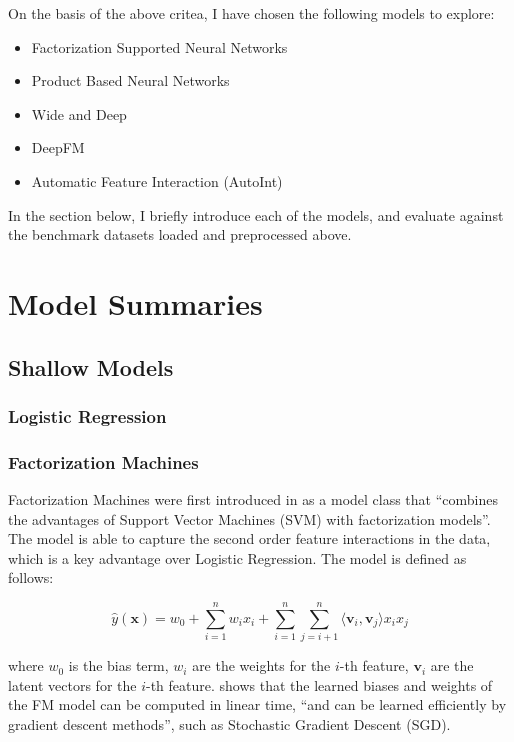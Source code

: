\documentclass{mldsmsc}
\begin{document}
On the basis of the above critea, I have chosen the following models to explore:

\begin{itemize}
\item Factorization Supported Neural Networks
\item Product Based Neural Networks
\item Wide and Deep
\item DeepFM
\item Automatic Feature Interaction (AutoInt)
\end{itemize}

In the section below, I briefly introduce each of the models, and evaluate against the benchmark datasets loaded and preprocessed above.

\section{Model Summaries}

\subsection{Shallow Models}

\subsubsection{Logistic Regression}


\subsubsection{Factorization Machines}

Factorization Machines were first introduced in \citep{RefWorks:rendle2010factorization} as
a model class that ``combines the advantages of Support Vector Machines (SVM) with factorization models''.
The model is able to capture the second order feature interactions in the data, which is a key advantage over
Logistic Regression. The model is defined as follows:

\begin{equation}
\label{eq:fm}
\hat{y}(\mathbf{x}) = w_0 + \sum_{i=1}^{n} w_i x_i + \sum_{i=1}^{n} \sum_{j=i+1}^{n} \langle \mathbf{v}_i, \mathbf{v}_j \rangle x_i x_j
\end{equation}

where $w_0$ is the bias term, $w_i$ are the weights for the $i$-th feature, $\mathbf{v}_i$ are the latent vectors for the $i$-th feature.
\cite{RefWorks:rendle2010factorization} shows that the learned biases and weights of the FM model can be
computed in linear time, ``and can be learned efficiently by gradient descent methods'', such as Stochastic Gradient Descent (SGD).
\end{document}
